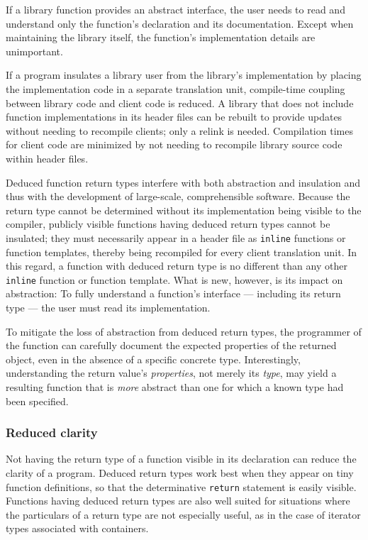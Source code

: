 If a library function provides an abstract interface, the user needs to
read and understand only the function's declaration and its
documentation. Except when maintaining the library itself, the
function's implementation details are unimportant.

If a program insulates a library user from the library's implementation
by placing the implementation code in a separate translation unit,
compile-time coupling between library code and client code is reduced. A
library that does not include function implementations in its header
files can be rebuilt to provide updates without needing to recompile
clients; only a relink is needed. Compilation times for client code are
minimized by not needing to recompile library source code within header
files.

Deduced function return types interfere with both abstraction and
insulation and thus with the development of large-scale, comprehensible
software. Because the return type cannot be determined without its
implementation being visible to the compiler, publicly visible functions
having deduced return types cannot be insulated; they must necessarily
appear in a header file as \lstinline!inline! functions or function
templates, thereby being recompiled for every client translation unit.
In this regard, a function with deduced return type is no different than
any other \lstinline!inline! function or function template. What is new,
however, is its impact on abstraction: To fully understand a function's
interface --- including its return type --- the user must read its
implementation.

To mitigate the loss of abstraction from deduced return types, the
programmer of the function can carefully document the expected
properties of the returned object, even in the absence of a specific
concrete type. Interestingly, understanding the return value's
\emph{properties}, not merely its \emph{type}, may yield a resulting
function that is \emph{more} abstract than one for which a known type
had been specified.

\subsubsection[Reduced clarity]{Reduced clarity}\label{reduced-clarity}

Not having the return type of a function visible in its declaration can
reduce the clarity of a program. Deduced return types work best when
they appear on tiny function definitions, so that the determinative
\lstinline!return! statement is easily visible. Functions having deduced
return types are also well suited for situations where the particulars
of a return type are not especially useful, as in the case of iterator
types associated with containers.

